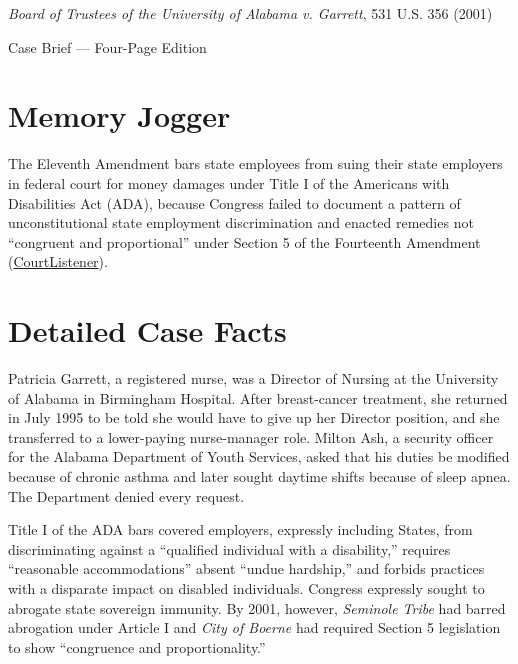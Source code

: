 \documentclass[12pt]{article}
\begin{document}
\begin{center}
{\LARGE \textit{Board of Trustees of the University of Alabama v. Garrett}, 531 U.S. 356 (2001)\par}
\vspace{0.8em}
{\large Case Brief --- Four-Page Edition\par}
\end{center}
\vspace{1em}

\section{Memory Jogger}

The Eleventh Amendment bars state employees from suing their state employers in federal court for money damages under Title I of the Americans with Disabilities Act (ADA), because Congress failed to document a pattern of unconstitutional state employment discrimination and enacted remedies not ``congruent and proportional'' under Section 5 of the Fourteenth Amendment (\href{https://www.courtlistener.com/opinion/118407/board-of-trustees-of-univ-of-ala-v-garrett/}{CourtListener}).

\section{Detailed Case Facts}

Patricia Garrett, a registered nurse, was a Director of Nursing at the University of Alabama in Birmingham Hospital. After breast-cancer treatment, she returned in July 1995 to be told she would have to give up her Director position, and she transferred to a lower-paying nurse-manager role. Milton Ash, a security officer for the Alabama Department of Youth Services, asked that his duties be modified because of chronic asthma and later sought daytime shifts because of sleep apnea. The Department denied every request.

Title I of the ADA bars covered employers, expressly including States, from discriminating against a ``qualified individual with a disability,'' requires ``reasonable accommodations'' absent ``undue hardship,'' and forbids practices with a disparate impact on disabled individuals. Congress expressly sought to abrogate state sovereign immunity. By 2001, however, \textit{Seminole Tribe} had barred abrogation under Article I and \textit{City of Boerne} had required Section 5 legislation to show ``congruence and proportionality.''
\end{document}
